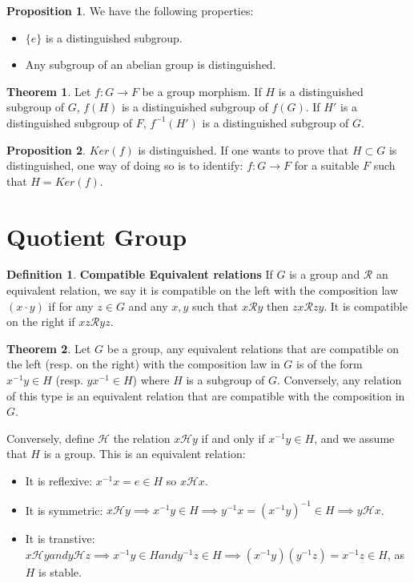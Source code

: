 \documentclass{article}
\theoremstyle{definition}
\newtheorem{defi}{Definition}[subsection]
\newtheorem{theorem}{Theorem}[subsection]
\newtheorem{prop}{Proposition}[subsection]
\begin{document}
\begin{prop}
We have the following properties:
\begin{itemize}
    \item $\{e\}$ is a distinguished subgroup.
    \item Any subgroup of an abelian group is distinguished.
\end{itemize}
\end{prop}

\begin{theorem}
Let $f: G \to F$ be a group morphism. If $H$ is a distinguished subgroup of $G$, $f(H)$ is a distinguished subgroup of $f(G)$. If $H'$ is a distinguished subgroup of $F$, $f^{-1}(H')$ is a distinguished subgroup of $G$.
\end{theorem}

\begin{prop}
$Ker(f)$ is distinguished. If one wants to prove that $H\subset G$ is distinguished, one way of doing so is to identify: $f: G\to F$ for a suitable $F$ such that $H=Ker(f)$.
\end{prop}

\section{Quotient Group}

\begin{defi}
\textbf{Compatible Equivalent relations} If $G$ is a group and $\mathcal{R}$ an equivalent relation, we say it is compatible on the left with the composition law $(x\cdot y)$ if for any $z\in G$ and any $x,y$ such that $x\mathcal{R}y$ then $zx\mathcal{R}zy$. It is compatible on the right if $xz\mathcal{R}yz$.
\end{defi}

\begin{theorem}
Let $G$ be a group, any equivalent relations that are compatible on the left (resp. on the right) with the composition law in $G$ is of the form $x^{-1}y\in H$ (resp. $yx^{-1}\in H$) where $H$ is a subgroup of $G$. Conversely, any relation of this type is an equivalent relation that are compatible with the composition in $G$.

Conversely, define $\mathcal{H}$ the relation $x\mathcal{H}y$ if and only if $x^{-1}y\in H$, and we assume that $H$ is a group. This is an equivalent relation:
\begin{itemize}
    \item It is reflexive: $x^{-1}x=e\in H$ so $x\mathcal{H}x$.
    \item It is symmetric: $x\mathcal{H}y \implies x^{-1}y\in H \implies y^{-1}x = (x^{-1}y)^{-1}\in H \implies y\mathcal{H}x$.
    \item It is transtive: $x\mathcal{H}y and y\mathcal{H}z \implies x^{-1}y\in H and y^{-1}z \in H \implies (x^{-1}y)(y^{-1}z)=x^{-1}z\in H$, as $H$ is stable.
    \end{itemize}
\end{theorem}
\end{document}
